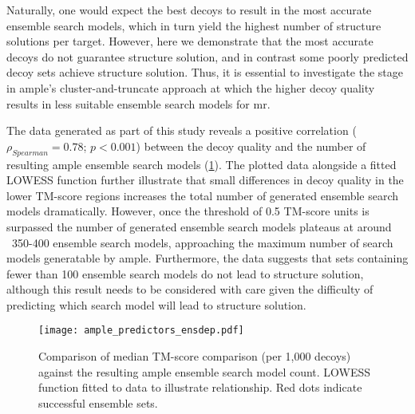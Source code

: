 Naturally, one would expect the best decoys to result in the most accurate ensemble search models, which in turn yield the highest number of structure solutions per target. However, here we demonstrate that the most accurate decoys do not guarantee structure solution, and in contrast some poorly predicted decoy sets achieve structure solution. Thus, it is essential to investigate the stage in \gls{ample}’s cluster-and-truncate approach at which the higher decoy quality results in less suitable ensemble search models for \gls{mr}.

The data generated as part of this study reveals a positive correlation ($\rho_{Spearman}=0.78$; $p<0.001$) between the decoy quality and the number of resulting \gls{ample} ensemble search models (\cref{fig:ample_predictor_ensdep}). The plotted data alongside a fitted LOWESS function further illustrate that small differences in decoy quality in the lower TM-score regions increases the total number of generated ensemble search models dramatically. However, once the threshold of 0.5 TM-score units \cite{Xu2010-sw} is surpassed the number of generated ensemble search models plateaus at around ~350-400 ensemble search models, approaching the maximum number of search models generatable by \gls{ample}. Furthermore, the data suggests that sets containing fewer than 100 ensemble search models do not lead to structure solution, although this result needs to be considered with care given the difficulty of predicting which search model will lead to structure solution.

\begin{figure}[H]
    \centering
    \texttt{[image: ample\_predictors\_ensdep.pdf]}
    \caption{Comparison of median TM-score comparison (per 1,000 decoys) against the resulting \gls{ample} ensemble search model count. LOWESS function fitted to data to illustrate relationship. Red dots indicate successful ensemble sets.}
    \label{fig:ample_predictor_ensdep}
\end{figure}

